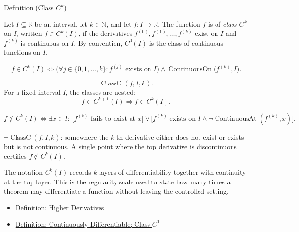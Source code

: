 \begin{definitionbox}{Definition (Class \(C^k\))}
\begin{definition}[Class \(C^k\)]
\label{def:class-ck}
Let \(I\subseteq\mathbb{R}\) be an interval, let \(k\in\mathbb{N}\), and let \(f:I\to\mathbb{R}\). The function \(f\) is of \emph{class \(C^k\)} on \(I\), written \(f\in C^k(I)\), if the derivatives \(f^{(0)},f^{(1)},\ldots,f^{(k)}\) exist on \(I\) and \(f^{(k)}\) is continuous on \(I\). By convention, \(C^0(I)\) is the class of continuous functions on \(I\).
\end{definition}
\end{definitionbox}

\begin{remark*}
\[
  f\in C^k(I)
  \Longleftrightarrow
  \bigl(\forall j\in\{0,1,\ldots,k\}: f^{(j)}\text{ exists on }I\bigr)
  \land
  \operatorname{ContinuousOn}\bigl(f^{(k)},I\bigr).
\]
\end{remark*}

\begin{remark*}
\[
  \operatorname{ClassC}(f,I,k).
\]
For a fixed interval \(I\), the classes are nested:
\[
  f\in C^{k+1}(I)\Longrightarrow f\in C^k(I).
\]
\end{remark*}

\begin{remark*}
\[
  f\notin C^k(I)
  \Longleftrightarrow
  \exists x\in I:\ \bigl[f^{(k)}\text{ fails to exist at }x\bigr]
  \vee
  \bigl[f^{(k)}\text{ exists on }I\land
  \neg\operatorname{ContinuousAt}(f^{(k)},x)\bigr].
\]
\end{remark*}

\begin{remark*}
\(\neg\operatorname{ClassC}(f,I,k)\): somewhere the \(k\)-th derivative
either does not exist or exists but is not continuous. A single point where
the top derivative is discontinuous certifies \(f\notin C^k(I)\).
\end{remark*}

\begin{remark*}[Interpretation]
The notation \(C^k(I)\) records \(k\) layers of differentiability together with continuity at the top layer. This is the regularity scale used to state how many times a theorem may differentiate a function without leaving the controlled setting.
\end{remark*}

\begin{dependencies}
\begin{itemize}
  \item \hyperref[def:higher-derivatives]{Definition: Higher Derivatives}
  \item \hyperref[def:class-c1]{Definition: Continuously Differentiable; Class \(C^1\)}
\end{itemize}
\end{dependencies}

